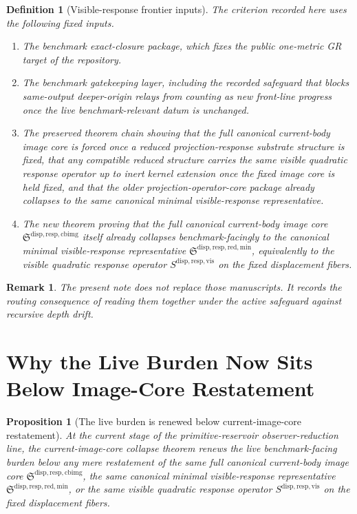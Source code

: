 \documentclass[11pt]{article}
\newcommand{\CurrentBodyImageCore}{\mathfrak S^{\mathrm{disp,resp,cbimg}}}
\newcommand{\VisibleResponseOperator}{S^{\mathrm{disp,resp,vis}}}
\newcommand{\MinimalReducedStructure}{\mathfrak S^{\mathrm{disp,resp,red,min}}}
\newtheorem{definition}{Definition}
\newtheorem{proposition}{Proposition}
\newtheorem{remark}{Remark}
\begin{document}
\begin{definition}[Visible-response frontier inputs]
The criterion recorded here uses the following fixed inputs.
\begin{enumerate}
    \item The benchmark exact-closure package, which fixes the public one-metric GR target of the repository.
    \item The benchmark gatekeeping layer, including the recorded safeguard that blocks same-output deeper-origin relays from counting as new front-line progress once the live benchmark-relevant datum is unchanged.
    \item The preserved theorem chain showing that the full canonical current-body image core is forced once a reduced projection-response substrate structure is fixed, that any compatible reduced structure carries the same visible quadratic response operator up to inert kernel extension once the fixed image core is held fixed, and that the older projection-operator-core package already collapses to the same canonical minimal visible-response representative.
    \item The new theorem proving that the full canonical current-body image core \(\CurrentBodyImageCore\) itself already collapses benchmark-facingly to the canonical minimal visible-response representative \(\MinimalReducedStructure\), equivalently to the visible quadratic response operator \(\VisibleResponseOperator\) on the fixed displacement fibers.
\end{enumerate}
\end{definition}

\begin{remark}
The present note does not replace those manuscripts. It records the routing consequence of reading them together under the active safeguard against recursive depth drift.
\end{remark}

\section{Why the Live Burden Now Sits Below Image-Core Restatement}

\begin{proposition}[The live burden is renewed below current-image-core restatement]
At the current stage of the primitive-reservoir observer-reduction line, the current-image-core collapse theorem renews the live benchmark-facing burden below any mere restatement of the same full canonical current-body image core \(\CurrentBodyImageCore\), the same canonical minimal visible-response representative \(\MinimalReducedStructure\), or the same visible quadratic response operator \(\VisibleResponseOperator\) on the fixed displacement fibers.
\end{proposition}
\end{document}

